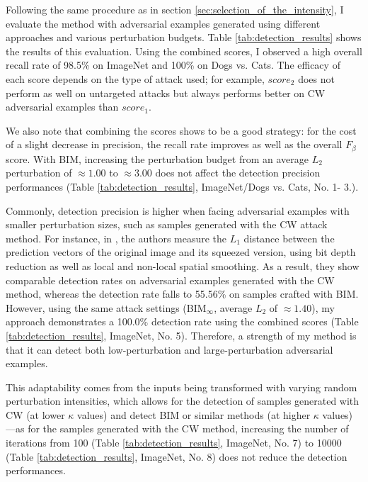 Following the same procedure as in section \ref{sec:selection_of_the_intensity},
I evaluate the method with adversarial examples generated using different
approaches and various perturbation budgets. Table \ref{tab:detection_results}
shows the results of this evaluation. Using the combined scores, I observed a
high overall recall rate of 98.5\% on ImageNet and 100\% on Dogs vs. Cats. The
efficacy of each score depends on the type of attack used; for example,
$score_2$ does not perform as well on untargeted attacks but always performs
better on CW adversarial examples than $score_1$.

We also note that combining the scores shows to be a good strategy: for the cost
of a slight decrease in precision, the recall rate improves as well as the
overall $F_{\beta}$ score. With BIM, increasing the perturbation budget from an
average $L_2$ perturbation of $\approx 1.00$ to $\approx 3.00$ does not affect
the detection precision performances (Table \ref{tab:detection_results},
ImageNet/Dogs vs. Cats, No. 1- 3.).

Commonly, detection precision is higher when facing adversarial examples with
smaller perturbation sizes, such as samples generated with the CW attack method.
For instance, in \cite{xu_feature_2018}, the authors measure the $L_1$ distance
between the prediction vectors of the original image and its squeezed version,
using bit depth reduction as well as local and non-local spatial smoothing. As a
result, they show comparable detection rates on adversarial examples generated
with the CW method, whereas the detection rate falls to 55.56\% on samples
crafted with BIM. However, using the same attack settings (BIM$_\infty$, average
$L_2$ of $\approx 1.40$), my approach demonstrates a 100.0\% detection rate
using the combined scores (Table \ref{tab:detection_results}, ImageNet, No. 5).
Therefore, a strength of my method is that it can detect both low-perturbation
and large-perturbation adversarial examples.

This adaptability comes from the inputs being transformed with varying random
perturbation intensities, which allows for the detection of samples generated
with CW (at lower $\kappa$ values) and detect BIM or similar methods (at
higher $\kappa$ values)—as for the samples generated with the CW method,
increasing the number of iterations from 100 (Table \ref{tab:detection_results},
ImageNet, No. 7) to 10000 (Table \ref{tab:detection_results}, ImageNet, No. 8)
does not reduce the detection performances.

